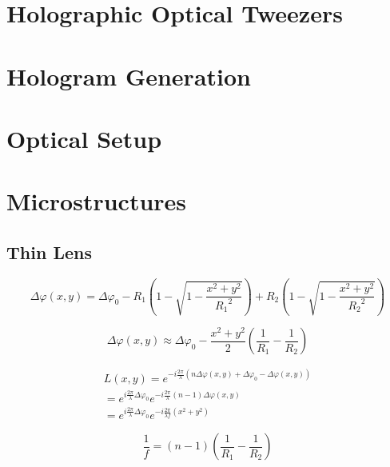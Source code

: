 \documentclass{kepfl}
\begin{document}
\chapter{Holographic Optical Tweezers}
\chapter{Hologram Generation}
\chapter{Optical Setup}

\chapter{Microstructures}


\section{Thin Lens}

\begin{equation}
\Delta \varphi (x,y) = \Delta {\varphi _0} - {R_1}\left( {1 - \sqrt {1 - \frac{{{x^2} + {y^2}}}{{{R_1}^2}}} } \right) + {R_2}\left( {1 - \sqrt {1 - \frac{{{x^2} + {y^2}}}{{{R_2}^2}}} } \right)
\end{equation}

\begin{equation}
\Delta \varphi (x,y) \approx \Delta {\varphi _0} - \frac{{{x^2} + {y^2}}}{2}\left( {\frac{1}{{{R_1}}} - \frac{1}{{{R_2}}}} \right)
\end{equation}


\begin{equation}
	\begin{array}{c}
L(x,y) = {e^{ - i\frac{{2\pi }}{\lambda }\left( {n\Delta \varphi (x,y) + \Delta {\varphi _0} - \Delta \varphi (x,y)} \right)}}\\
 = {e^{i\frac{{2\pi }}{\lambda }\Delta {\varphi _0}}}{e^{ - i\frac{{2\pi }}{\lambda }(n - 1)\Delta \varphi (x,y)}}\\
 = {e^{i\frac{{2\pi }}{\lambda }\Delta {\varphi _0}}}{e^{ - i\frac{{2\pi }}{{\lambda f}}({x^2} + {y^2})}}
\end{array}
\end{equation}


\begin{equation}
\frac{1}{f} = (n - 1)\left( {\frac{1}{{{R_1}}} - \frac{1}{{{R_2}}}} \right)	
\end{equation}
\end{document}
